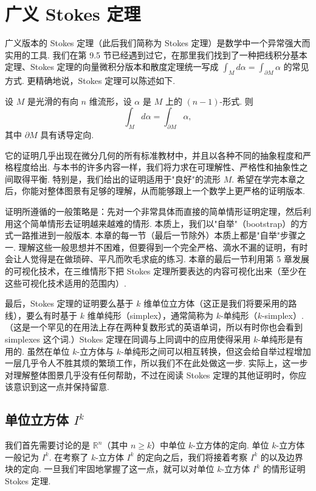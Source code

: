 \chapter{广义 Stokes 定理}

广义版本的 Stokes 定理（此后我们简称为 Stokes 定理）是数学中一个异常强大而实用的工具. 我们在第 9.5 节已经遇到过它，在那里我们找到了一种把线积分基本定理、Stokes 定理的向量微积分版本和散度定理统一写成 $\int_M d\alpha=\int_{\partial M}\alpha$ 的常见方式. 更精确地说，Stokes 定理可以陈述如下.

\begin{theorem}[广义 Stokes 定理]\label{thm:11-1}
设 $M$ 是光滑的有向 $n$ 维流形，设 $\alpha$ 是 $M$ 上的 $(n-1)$-形式. 则
\[
\int_M d\alpha=\int_{\partial M}\alpha,
\]
其中 $\partial M$ 具有诱导定向.
\end{theorem}

它的证明几乎出现在微分几何的所有标准教材中，并且以各种不同的抽象程度和严格程度给出. 与本书的许多内容一样，我们将力求在可理解性、严格性和抽象性之间取得平衡. 特别是，我们给出的证明适用于"良好"的流形 $M$. 希望在学完本章之后，你能对整体图景有足够的理解，从而能够跟上一个数学上更严格的证明版本.

证明所遵循的一般策略是：先对一个非常具体而直接的简单情形证明定理，然后利用这个简单情形去证明越来越难的情形. 本质上，我们以"自举"（bootstrap）的方式一路推进到一般版本. 本章的每一节（最后一节除外）本质上都是"自举"步骤之一. 理解这些一般思想并不困难，但要得到一个完全严格、滴水不漏的证明，有时会让人觉得是在做琐碎、平凡而吹毛求疵的练习. 本章的最后一节利用第 5 章发展的可视化技术，在三维情形下把 Stokes 定理所要表达的内容可视化出来（至少在这些可视化技术适用的范围内）.

最后，Stokes 定理的证明要么基于 $k$ 维单位立方体（这正是我们将要采用的路线），要么有时基于 $k$ 维单纯形（simplex），通常简称为 $k$-单纯形（$k$-simplex）. （这是一个罕见的在用法上存在两种复数形式的英语单词，所以有时你也会看到 simplexes 这个词.）Stokes 定理在同调与上同调中的应用使得采用 $k$-单纯形是有用的. 虽然在单位 $k$-立方体与 $k$-单纯形之间可以相互转换，但这会给自举过程增加一层几乎令人不胜其烦的繁琐工作，所以我们不在此处做这一步. 实际上，这一步对理解整体图景几乎没有任何帮助，不过在阅读 Stokes 定理的其他证明时，你应该意识到这一点并保持留意.

\section{单位立方体 $I^k$}

我们首先需要讨论的是 $\mathbb{R}^n$（其中 $n\geq k$）中单位 $k$-立方体的定向. 单位 $k$-立方体一般记为 $I^k$. 在考察了 $k$-立方体 $I^k$ 的定向之后，我们将接着考察 $I^k$ 的以及边界块的定向. 一旦我们牢固地掌握了这一点，就可以对单位 $k$-立方体 $I^k$ 的情形证明 Stokes 定理.

